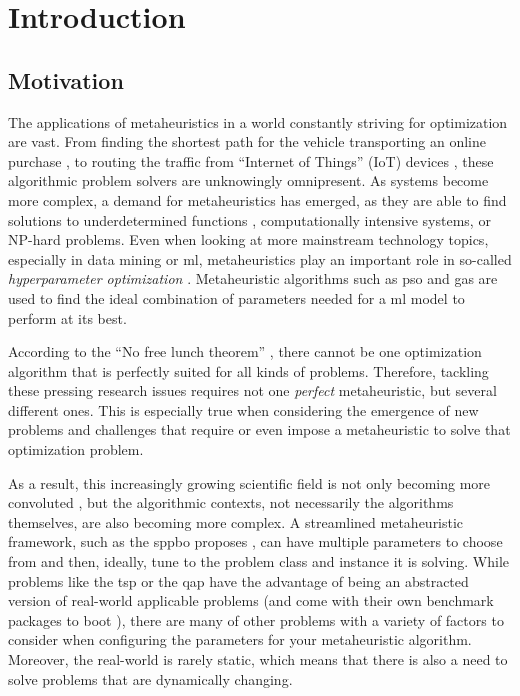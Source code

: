 
\chapter{Introduction}
\label{chap:introduction}

\section{Motivation}

The applications of metaheuristics in a world constantly striving for optimization are vast. From finding the shortest path for the vehicle transporting an online purchase \cite{vogel2011flexible}, to routing the traffic from \enquote{Internet of Things} (IoT) devices \cite{sharma2022systematic}, these algorithmic problem solvers are unknowingly omnipresent. As systems become more complex, a demand for metaheuristics has emerged, as they are able to find solutions to underdetermined functions \cite{jamisola2009using}, computationally intensive systems, or NP-hard problems. Even when looking at more mainstream technology topics, especially in data mining or \gls{ml}, metaheuristics play an important role in so-called \textit{hyperparameter optimization} \cite{yang2020hyperparameter}. Metaheuristic algorithms such as \gls{pso} and \glspl{ga} are used to find the ideal combination of parameters needed for a \gls{ml} model to perform at its best.

According to the \enquote{No free lunch theorem} \cite{wolpert1997no}, there cannot be one optimization algorithm that is perfectly suited for all kinds of problems. Therefore, tackling these pressing research issues requires not one \textit{perfect} metaheuristic, but several different ones. This is especially true when considering the emergence of new problems and challenges that require or even impose a metaheuristic to solve that optimization problem.

 As a result, this increasingly growing scientific field is not only becoming more convoluted \cite{sorensen2018history}, but the algorithmic contexts, not necessarily the algorithms themselves, are also becoming more complex. A streamlined metaheuristic framework, such as the \gls{sppbo} proposes \cite{lin2015simple}, can have multiple parameters to choose from and then, ideally, tune to the problem class and instance it is solving. While problems like the \gls{tsp} or the \gls{qap} have the advantage of being an abstracted version of real-world applicable problems (and come with their own benchmark packages to boot \cite{reinelt1991tsplib, burkard1997qaplib}), there are many of other problems with a variety of factors to consider when configuring the parameters for your metaheuristic algorithm. Moreover, the real-world is rarely static, which means that there is also a need to solve problems that are dynamically changing.


